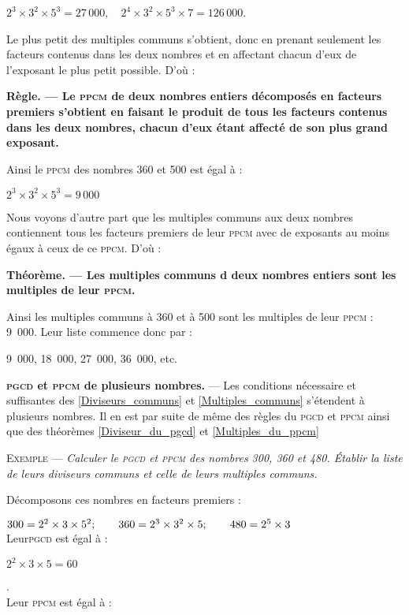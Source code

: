  $2^3 \times 3^2 \times 5^3  = 27\,000, \quad 2^4 \times 3^2 \times 5^3 \times 7 = 126\, 000$.
 
  
Le plus petit des multiples communs s'obtient, donc en prenant seulement les facteurs contenus dans les deux nombres et en affectant chacun d'eux de l'exposant le plus petit possible. D'où : 


\textbf{Règle. — Le \textsc{ppcm} de deux nombres entiers décomposés en facteurs premiers s'obtient en faisant le produit de tous les facteurs contenus dans les deux nombres, chacun d'eux étant affecté de son plus grand exposant.}

 Ainsi le \textsc{ppcm}  des nombres 360 et 500 est égal à : 
 
 \centerline{$2^3 \times 3^2 \times 5^3 = 9\,000$}
 
Nous voyons d'autre part que les multiples communs aux deux nombres contiennent tous les facteurs premiers
de leur \textsc{ppcm} avec de exposants  au moins égaux à ceux de ce \textsc{ppcm}. D'où : 

\textbf{Théorème. — Les multiples communs d deux nombres entiers sont les multiples de leur \textsc{ppcm}.}\label{Multiples_du_ppcm}

  Ainsi les multiples communs à 360 et à 500 sont les multiples de leur  \textsc{ppcm} : 9~000.  Leur liste commence donc par : 
  
  \centerline{9~000, 18~000, 27~000, 36~000, etc. }

\textbf{\textsc{pgcd} et \textsc{ppcm} de plusieurs nombres.} — Les conditions nécessaire et suffisantes des \ref{Diviseurs_communs} et \ref{Multiples_communs} s'étendent à plusieurs nombres. Il en est par suite de même des règles du \textsc{pgcd} et \textsc{ppcm}  ainsi que des théorèmes \ref{Diviseur_du_pgcd}  et \ref{Multiples_du_ppcm}


\textsc{Exemple} — \textit {Calculer le \textsc{pgcd} et \textsc{ppcm}  des nombres 300, 360 et 480. Établir la liste de leurs diviseurs communs et celle de leurs multiples communs.}

 Décomposons ces nombres en facteurs premiers : 
 
 $300 = 2^2  \times  3 \times  5^2 ; \qquad 360 = 2^3  \times 3^2  \times  5; \qquad 480= 2^5 \times 3 \time 5 $\\
  Leur\textsc{pgcd} est égal à : \\
  \centerline {$ 2^2 \times 3 \times 5 = 60 $}.\\
  
 Leur \textsc{ppcm}  est égal à : \\
 

